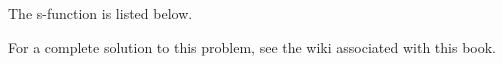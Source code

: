 
The s-function is listed below.

%


\ifsolutionmanual



\else



\fi


For a complete solution to this problem, see the wiki associated with this book.
